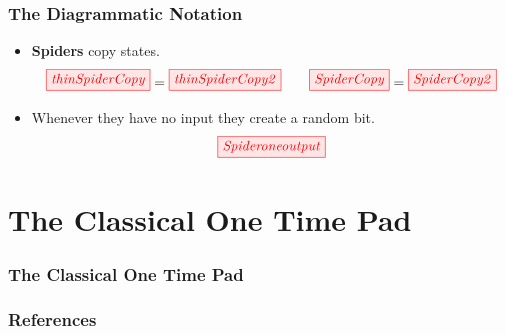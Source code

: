 \documentclass[]{beamer}
\begin{document}
\begin{frame}
	\frametitle{The Diagrammatic Notation}
	\begin{itemize}
		\item \textbf{Spiders} copy states.
			\begin{equation}
			\tikzfig{thinSpiderCopy} = \tikzfig{thinSpiderCopy2} ~~~~~~ \tikzfig{SpiderCopy} = \tikzfig{SpiderCopy2}
			\end{equation}
		\item Whenever they have no input they create a random bit.
		\begin{equation}
		\tikzfig{Spideroneoutput} 
		\end{equation}
	\end{itemize}
\end{frame}

\section{The Classical One Time Pad}

\begin{frame}
	\frametitle{The Classical One Time Pad}
\end{frame}

\begin{frame}
	\frametitle{References}

	
	
\end{frame}
\end{document}
